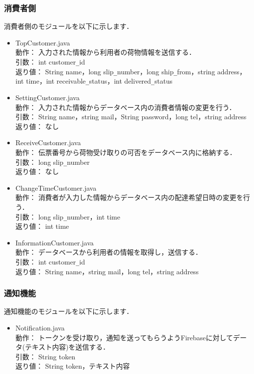 \documentclass[a4j,titlepage]{jarticle}
\begin{document}
\subsubsection{消費者側}
消費者側のモジュールを以下に示します．
\begin{itemize}
\item TopCustomer.java\\
動作： 入力された情報から利用者の荷物情報を送信する．\\
引数： int customer\verb|_|id\\
返り値： String name，long slip\verb|_|number，long ship\verb|_|from，string address，int time，int receivable\verb|_|status，int delivered\verb|_|status
\item SettingCustomer.java\\
動作： 入力された情報からデータベース内の消費者情報の変更を行う．\\
引数： String name，string mail，String password，long tel，string address\\
返り値： なし
\item ReceiveCustomer.java\\
動作： 伝票番号から荷物受け取りの可否をデータベース内に格納する．\\
引数： long slip\verb|_|number\\
返り値： なし
\item ChangeTimeCustomer.java\\
動作： 消費者が入力した情報からデータベース内の配達希望日時の変更を行う．\\
引数： long slip\verb|_|number，int time\\
返り値： int time
\item InformationCustomer.java\\
動作： データベースから利用者の情報を取得し，送信する．\\
引数： int customer\verb|_|id\\
返り値： String name，string mail，long tel，string address
\end{itemize}

\subsubsection{通知機能}
通知機能のモジュールを以下に示します．
\begin{itemize}
\item Notification.java\\
動作： トークンを受け取り，通知を送ってもらうようFirebaseに対してデータ(テキスト内容)を送信する．\\
引数： String token\\
返り値： String token，テキスト内容
\end{itemize}
\end{document}
